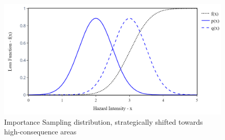     \begin{figure}[H]
        \centering
        \includegraphics[scale=0.5]{Figures/Images/Illustrative Example/IS_dist.png}
        \caption{Importance Sampling distribution, strategically shifted towards high-consequence areas}
        \label{fig:IS_dist}
    \end{figure}